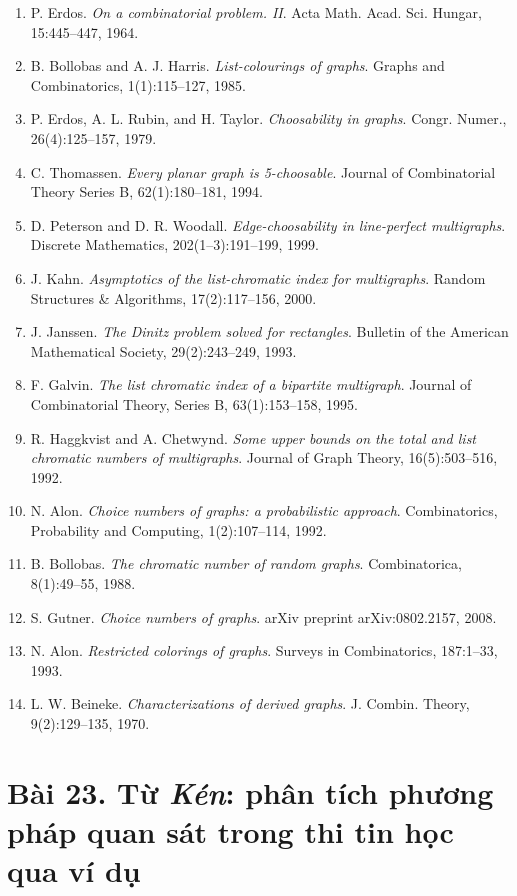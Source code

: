 \documentclass[11pt]{article}
\begin{document}
\begin{enumerate}
\item P. Erdos. \emph{On a combinatorial problem. II}. Acta Math. Acad. Sci.
Hungar, 15:445--447, 1964.
\item B. Bollobas and A. J. Harris. \emph{List-colourings of graphs}. Graphs
and Combinatorics, 1(1):115--127, 1985.
\item P. Erdos, A. L. Rubin, and H. Taylor. \emph{Choosability in graphs}.
Congr. Numer., 26(4):125--157, 1979.
\item C. Thomassen. \emph{Every planar graph is 5-choosable}. Journal of
Combinatorial Theory Series B, 62(1):180--181, 1994.
\item D. Peterson and D. R. Woodall. \emph{Edge-choosability in line-perfect
multigraphs}. Discrete Mathematics, 202(1--3):191--199, 1999.
\item J. Kahn. \emph{Asymptotics of the list-chromatic index for multigraphs}.
Random Structures \& Algorithms, 17(2):117--156, 2000.
\item J. Janssen. \emph{The Dinitz problem solved for rectangles}. Bulletin of
the American Mathematical Society, 29(2):243--249, 1993.
\item F. Galvin. \emph{The list chromatic index of a bipartite multigraph}.
Journal of Combinatorial Theory, Series B, 63(1):153--158, 1995.
\item R. Haggkvist and A. Chetwynd. \emph{Some upper bounds on the total and
list chromatic numbers of multigraphs}. Journal of Graph Theory,
16(5):503--516, 1992.
\item N. Alon. \emph{Choice numbers of graphs: a probabilistic approach}.
Combinatorics, Probability and Computing, 1(2):107--114, 1992.
\item B. Bollobas. \emph{The chromatic number of random graphs}.
Combinatorica, 8(1):49--55, 1988.
\item S. Gutner. \emph{Choice numbers of graphs}. arXiv preprint
arXiv:0802.2157, 2008.
\item N. Alon. \emph{Restricted colorings of graphs}. Surveys in
Combinatorics, 187:1--33, 1993.
\item L. W. Beineke. \emph{Characterizations of derived graphs}. J. Combin.
Theory, 9(2):129--135, 1970.
\end{enumerate}

\section*{Bài 23. Từ \emph{Kén}: phân tích phương pháp quan sát trong thi tin học qua ví dụ}
\end{document}
